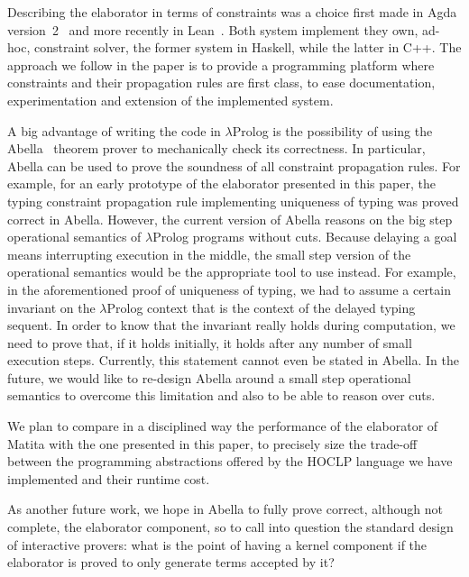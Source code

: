 \documentclass{easychair}
\begin{document}
Describing the elaborator in terms of constraints was a choice first 
made in Agda version~2~\cite{Agda} and more recently in Lean~\cite{Lean}.
Both system implement they own, ad-hoc, constraint solver, the former system in
Haskell, while the latter in C++.  The approach we follow in the paper
is to provide a programming platform where constraints and their propagation
rules are first class, to ease documentation, experimentation and extension
of the implemented system.

A big advantage of writing the code in $\lambda$Prolog is the possibility of
using the Abella~\cite{Abella} theorem prover to mechanically check
its correctness.
In particular, Abella can be used to prove the soundness of all constraint propagation rules. For example, for an early prototype of the elaborator presented
in this paper, the typing constraint propagation rule implementing uniqueness of
typing was proved correct in Abella. However, the current version of Abella reasons on the big step operational semantics of $\lambda$Prolog programs without cuts. Because delaying a goal means interrupting execution in the middle, the small step version of the operational semantics would be the appropriate tool to use instead. For example, in the aforementioned proof of uniqueness of typing, we had to assume a certain invariant on the $\lambda$Prolog context that is the context of the delayed typing sequent. In order to know that the invariant really holds during computation, we need to prove that, if it holds initially, it holds after any number of small execution steps. Currently, this statement cannot even be stated in Abella. In the future, we would like to re-design Abella around a small step operational semantics to overcome this limitation and also to be able to reason over cuts.

We plan to compare in a disciplined way the performance of the elaborator
of Matita with the one presented in this paper, to precisely size the
trade-off between the programming abstractions offered by the
HOCLP language we have implemented and their runtime cost.

As another future work, we hope in Abella to fully prove correct, although not complete, the
elaborator component, so to call into question the standard design of
interactive provers: what is the point of having a kernel component if the
elaborator is proved to only generate terms accepted by it?

\label{sect:bib}


\end{document}
